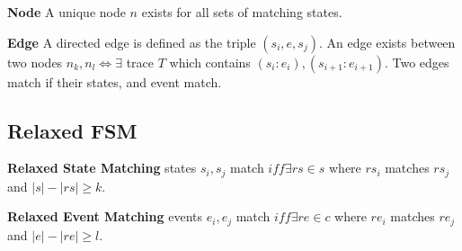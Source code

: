 \noindent\textbf{Node} A unique node $n$ exists for all sets of matching states.

\noindent\textbf{Edge} A directed edge is defined as the triple $(s_i, e,
s_j)$. An edge exists between two nodes $n_k, n_l \iff \exists$ trace $T$ which
contains $(s_i:e_i),(s_{i+1}:e_{i+1})$. Two edges match if their states, and event
match.

\subsection{Relaxed FSM}

\noindent\textbf{Relaxed State Matching} states $s_i, s_j$ match $iff \exists
rs \in s$ where $rs_i$ matches $rs_j$ and $|s| - |rs| \geq k$.

\noindent\textbf{Relaxed Event Matching} events $e_i, e_j$ match $iff \exists
re \in c$ where $re_i$ matches $re_j$ and $|e| - |re| \geq l$.

